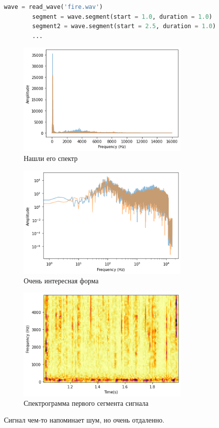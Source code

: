 \documentclass[a4paper, 12pt]{report}
\begin{document}
	\begin{lstlisting}[language=Python,caption=Взяли другой сигнал]
		wave = read_wave('fire.wav')
		segment = wave.segment(start = 1.0, duration = 1.0)
		segment2 = wave.segment(start = 2.5, duration = 1.0)
		...
	\end{lstlisting}
	\begin{figure}[H]
		\centering
		\includegraphics[width=0.75\textwidth]{test4.png}
		\caption{Нашли его спектр}
		\label{fig:test4}
	\end{figure}
	\begin{figure}[H]
		\centering
		\includegraphics[width=0.75\textwidth]{test5.png}
		\caption{Очень интересная форма}
		\label{fig:test5}
	\end{figure}
	\begin{figure}[H]
		\centering
		\includegraphics[width=0.75\textwidth]{test6.png}
		\caption{Спектрограмма первого сегмента сигнала}
		\label{fig:test6}
	\end{figure}
	Сигнал чем-то напоминает  шум, но очень отдаленно.
	
\end{document}
